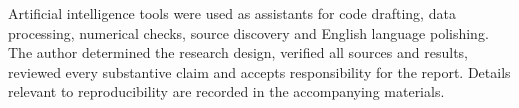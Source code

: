 Artificial intelligence tools were used as assistants for code drafting, data processing, numerical checks, source discovery and English language polishing. The author determined the research design, verified all sources and results, reviewed every substantive claim and accepts responsibility for the report. Details relevant to reproducibility are recorded in the accompanying materials.
